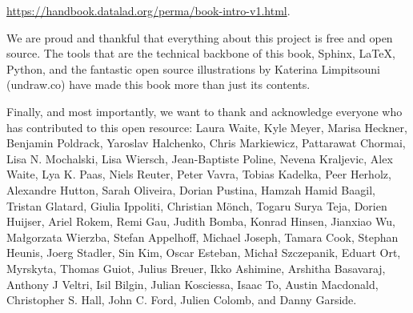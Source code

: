 \hspace{1cm}\url{https://handbook.datalad.org/perma/book-intro-v1.html}.

We are proud and thankful that everything about this project is free and open
source. The tools that are the technical backbone of this book, Sphinx, LaTeX,
Python, and the fantastic open source illustrations by Katerina Limpitsouni
(undraw.co) have made this book more than just its contents.

Finally, and most
importantly, we want to thank and acknowledge everyone who has contributed to
this open resource: Laura Waite, Kyle Meyer, Marisa Heckner, Benjamin
Poldrack, Yaroslav Halchenko, Chris Markiewicz, Pattarawat Chormai, Lisa N.
Mochalski, Lisa Wiersch, Jean-Baptiste Poline, Nevena Kraljevic, Alex Waite,
Lya K. Paas, Niels Reuter, Peter Vavra, Tobias Kadelka, Peer Herholz, Alexandre
Hutton, Sarah Oliveira, Dorian Pustina, Hamzah Hamid Baagil, Tristan Glatard,
Giulia Ippoliti, Christian Mönch, Togaru Surya Teja, Dorien Huijser, Ariel
Rokem, Remi Gau, Judith Bomba, Konrad Hinsen, Jianxiao Wu, Małgorzata Wierzba,
Stefan Appelhoff, Michael Joseph, Tamara Cook, Stephan Heunis, Joerg Stadler,
Sin Kim, Oscar Esteban, Michał Szczepanik, Eduart Ort, Myrskyta, Thomas Guiot,
Julius Breuer, Ikko Ashimine, Arshitha Basavaraj, Anthony J Veltri, Isil Bilgin,
Julian Kosciessa, Isaac To, Austin Macdonald, Christopher S. Hall, John C. Ford,
Julien Colomb, and Danny Garside.
